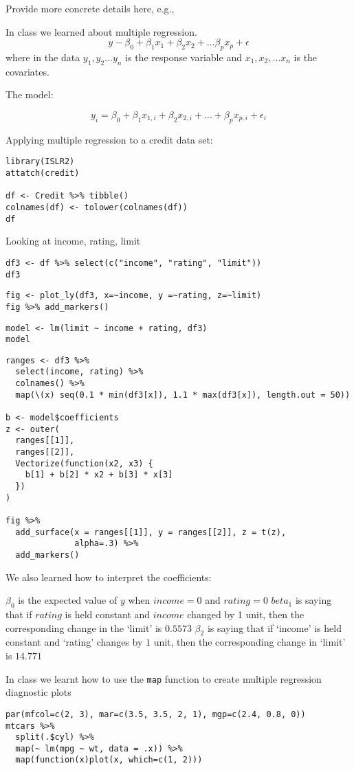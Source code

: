\documentclass[
  letterpaper,
  DIV=11,
  numbers=noendperiod]{scrartcl}
\begin{document}
Provide more concrete details here, e.g.,

In class we learned about multiple regression. \[
y - \beta_0 + \beta_1 x_1 + \beta_2 x_2 + \dots \beta_p x_p + \epsilon
\] where in the data \(y_1, y_2 \dots y_n\) is the response variable and
\(x_1, x_2, \dots x_n\) is the covariates.

The model:

\[
y_i = \beta_0 + \beta_1 x_{1,i} + \beta_2 x_{2,i} + \dots + \beta_p x_{p, i} + \epsilon_i
\]

Applying multiple regression to a credit data set:

\begin{verbatim}
library(ISLR2)
attatch(credit)

df <- Credit %>% tibble()
colnames(df) <- tolower(colnames(df))
df
\end{verbatim}

Looking at income, rating, limit

\begin{verbatim}
df3 <- df %>% select(c("income", "rating", "limit"))
df3
\end{verbatim}

\begin{verbatim}
fig <- plot_ly(df3, x=~income, y =~rating, z=~limit)
fig %>% add_markers()
\end{verbatim}

\begin{verbatim}
model <- lm(limit ~ income + rating, df3)
model
\end{verbatim}

\begin{verbatim}
ranges <- df3 %>%
  select(income, rating) %>%
  colnames() %>%
  map(\(x) seq(0.1 * min(df3[x]), 1.1 * max(df3[x]), length.out = 50))

b <- model$coefficients
z <- outer(
  ranges[[1]],
  ranges[[2]],
  Vectorize(function(x2, x3) {
    b[1] + b[2] * x2 + b[3] * x[3]
  })
)

fig %>%
  add_surface(x = ranges[[1]], y = ranges[[2]], z = t(z),
              alpha=.3) %>%
  add_markers()
\end{verbatim}

We also learned how to interpret the coefficients:

\(\beta_0\) is the expected value of \(y\) when \(income = 0\) and
\(rating = 0\) \(beta_1\) is saying that if \(rating\) is held constant
and \(income\) changed by 1 unit, then the corresponding change in the
`limit' is \(0.5573\) \(\beta_2\) is saying that if `income' is held
constant and `rating' changes by \(1\) unit, then the corresponding
change in `limit' is \(14.771\)

In class we learnt how to use the \texttt{map} function to create
multiple regression diagnostic plots

\begin{verbatim}
par(mfcol=c(2, 3), mar=c(3.5, 3.5, 2, 1), mgp=c(2.4, 0.8, 0))
mtcars %>%
  split(.$cyl) %>%
  map(~ lm(mpg ~ wt, data = .x)) %>%
  map(function(x)plot(x, which=c(1, 2)))
\end{verbatim}
\end{document}
